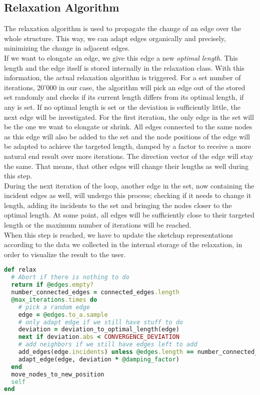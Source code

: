 \subsection{Relaxation Algorithm}\label{sec:relaxation}
The relaxation algorithm is used to propagate the change of an edge over the whole structure. This way, we can adapt edges organically and precisely, minimizing the change in adjacent edges.\\
If we want to elongate an edge, we give this edge a new \textit{optimal length}. This length and the edge itself is stored internally in the relaxation class. With this information, the actual relaxation algorithm is triggered. For a set number of iterations, 20'000 in our case, the algorithm will pick an edge out of the stored set randomly and checks if its current length differs from its optimal length, if any is set. If no optimal length is set or the deviation is sufficiently little, the next edge will be investigated. For the first iteration, the only edge in the set will be the one we want to elongate or shrink. All edges connected to the same nodes as this edge will also be added to the set and the node positions of the edge will be adapted to achieve the targeted length, damped by a factor to receive a more natural end result over more iterations. The direction vector of the edge will stay the same. That means, that other edges will change their lengths as well during this step.\\
During the next iteration of the loop, another edge in the set, now containing the incident edges as well, will undergo this process; checking if it needs to change it length, adding its incidents to the set and bringing the nodes closer to the optimal length. At some point, all edges will be sufficiently close to their targeted length or the maximum number of iterations will be reached.\\
When this step is reached, we have to update the sketchup representations according to the data we collected in the internal storage of the relaxation, in order to visualize the result to the user.

\begin{lstlisting}[language=Ruby, label={lst:relaxation}, caption=The relaxation algorithm]
def relax
  # Abort if there is nothing to do
  return if @edges.empty?
  number_connected_edges = connected_edges.length
  @max_iterations.times do
    # pick a random edge
    edge = @edges.to_a.sample
    # only adapt edge if we still have stuff to do
    deviation = deviation_to_optimal_length(edge)
    next if deviation.abs < CONVERGENCE_DEVIATION
    # add neighbors if we still have edges left to add
    add_edges(edge.incidents) unless @edges.length == number_connected_edges
    adapt_edge(edge, deviation * @damping_factor)
  end
  move_nodes_to_new_position
  self
end
\end{lstlisting}

